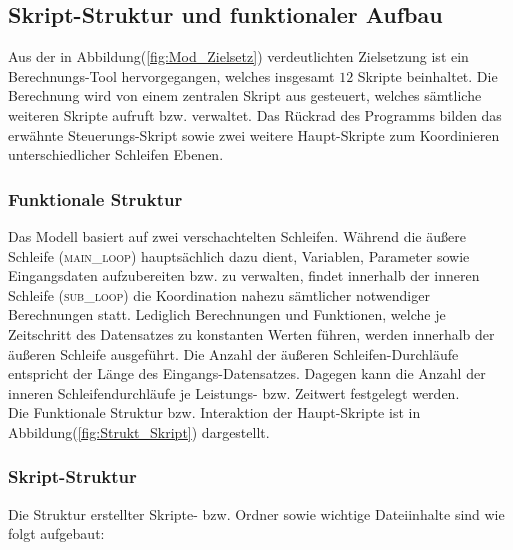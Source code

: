 \documentclass[onecolumn,10pt,titlepage]{article}
\begin{document}
\subsection{Skript-Struktur und funktionaler Aufbau}
\label{subs_Skript-Strukt}
Aus der in Abbildung(\ref{fig:Mod_Zielsetz}) verdeutlichten Zielsetzung ist ein Berechnungs-Tool hervorgegangen, welches insgesamt $12$ Skripte beinhaltet.
Die Berechnung wird von einem zentralen Skript aus gesteuert, welches sämtliche weiteren Skripte aufruft bzw. verwaltet. Das Rückrad des Programms bilden das erwähnte Steuerungs-Skript sowie zwei weitere Haupt-Skripte zum Koordinieren unterschiedlicher Schleifen Ebenen.

\subsubsection{Funktionale Struktur}
\label{subs_Funkt-Strukt}
Das Modell basiert auf zwei verschachtelten Schleifen. Während die äußere Schleife (\textsc{main\_loop}) hauptsächlich dazu dient, Variablen, Parameter sowie Eingangsdaten aufzubereiten bzw. zu verwalten, findet innerhalb der inneren Schleife (\textsc{sub\_loop}) die Koordination nahezu sämtlicher notwendiger Berechnungen statt. Lediglich Berechnungen und Funktionen, welche je Zeitschritt des Datensatzes zu konstanten Werten führen, werden innerhalb der äußeren Schleife ausgeführt. Die Anzahl der äußeren Schleifen-Durchläufe entspricht der Länge des Eingangs-Datensatzes. Dagegen kann die Anzahl der inneren Schleifendurchläufe je Leistungs- bzw. Zeitwert festgelegt werden.\\

Die Funktionale Struktur bzw. Interaktion der Haupt-Skripte ist in Abbildung(\ref{fig:Strukt_Skript}) dargestellt.
\newpage
\subsubsection{Skript-Struktur}
\label{subsubs_skrpt-strukt}
Die Struktur erstellter Skripte- bzw. Ordner sowie wichtige Dateiinhalte sind wie folgt aufgebaut:
\end{document}
